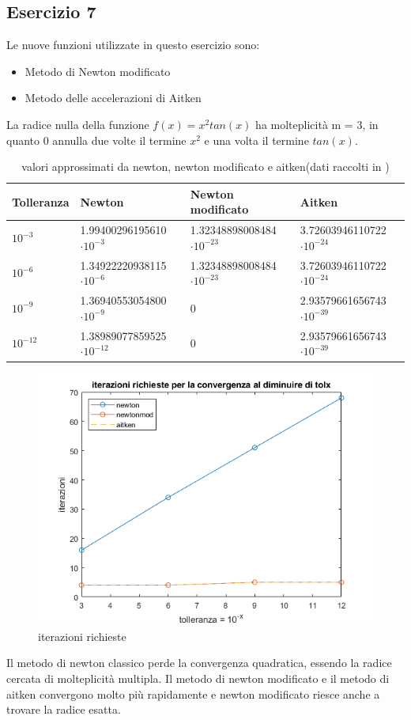 \subsection{Esercizio 7}
Le nuove funzioni utilizzate in  questo esercizio sono:
\begin{itemize}
    \item Metodo di Newton modificato
    
    \item Metodo delle accelerazioni di Aitken
    
\end{itemize}
La radice nulla della funzione $f(x)=x^2tan(x)$ ha molteplicità m = 3, in quanto $0$ annulla due volte il termine
$x^2$ e una volta il termine $tan(x)$. 


\begin{table}[h]
    \renewcommand\arraystretch{2}
    \begin{tabular}{|l l l l|}
            \hline
            Tolleranza &  Newton & Newton modificato & Aitken  \\
            \hline
            $10^{-3}$  &1.99400296195610$\cdot10^{-3}$ &1.32348898008484$\cdot10^{-23}$ & 3.72603946110722$\cdot10^{-24}$  \\
            $10^{-6}$  & 1.34922220938115$\cdot10^{-6}$ &1.32348898008484$\cdot10^{-23}$& 3.72603946110722$\cdot10^{-24}$ \\
            $10^{-9}$ &1.36940553054800$\cdot10^{-9}$&           0       & 2.93579661656743$\cdot10^{-39}$ \\
            $10^{-12}$ & 1.38989077859525$\cdot10^{-12}$ &       0             &2.93579661656743$\cdot10^{-39}$\\
            \hline
    \end{tabular}
    \caption{valori approssimati da newton, newton modificato e aitken(dati raccolti in )}
    \label{tab::2}     
    \end{table}
\newpage    
\begin{figure}[h]
\includegraphics[scale=0.7]{capitolo2/iter2.png}
\caption{iterazioni richieste}
\label{fig::es6}
\end{figure}
Il metodo di newton classico perde la convergenza quadratica, essendo la radice cercata di molteplicità multipla. Il metodo di newton modificato e il metodo di aitken convergono
molto più rapidamente e newton modificato riesce anche a trovare la radice esatta.
